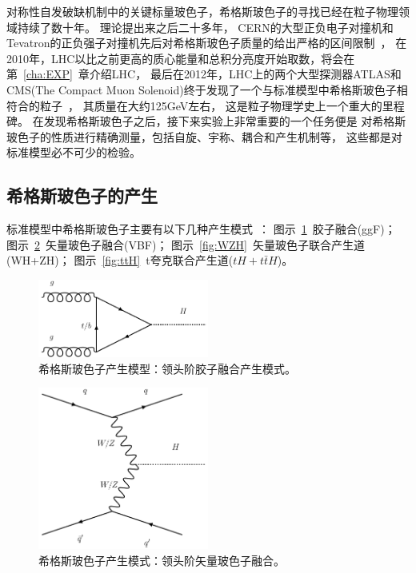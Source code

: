 对称性自发破缺机制中的关键标量玻色子，希格斯玻色子的寻找已经在粒子物理领域持续了数十年。
理论提出来之后二十多年，
CERN的大型正负电子对撞机和Tevatron的正负强子对撞机先后对希格斯玻色子质量的给出严格的区间限制~\cite{TEVN,LEP}，
在2010年，LHC以比之前更高的质心能量和总积分亮度开始取数，将会在第~\ref{cha:EXP}~章介绍LHC，
最后在2012年，LHC上的两个大型探测器ATLAS和CMS(The Compact Muon Solenoid)终于发现了一个与标准模型中希格斯玻色子相符合的粒子~\cite{ATLASHIGGS,CMSHIGGS}，
其质量在大约125GeV左右，
这是粒子物理学史上一个重大的里程碑。
在发现希格斯玻色子之后，接下来实验上非常重要的一个任务便是
对希格斯玻色子的性质进行精确测量，包括自旋、宇称、耦合和产生机制等，
这些都是对标准模型必不可少的检验。

\subsection{希格斯玻色子的产生}
\label{sec:HiggsPD}

标准模型中希格斯玻色子主要有以下几种产生模式~\cite{HANDHIGGS}：
图示~\ref{fig:ggF}~胶子融合(ggF)；
图示~\ref{fig:VBF}~矢量玻色子融合(VBF)；
图示~\ref{fig:WZH}~矢量玻色子联合产生道(WH+ZH)；
图示~\ref{fig:ttH}~t夸克联合产生道($tH+t\bar{t}H$)。

\begin{figure}
  \begin{center}
    \includegraphics[width=0.5\textwidth]{figuresTHE/ggF.pdf}
  \end{center}
  \caption{
希格斯玻色子产生模型：领头阶胶子融合产生模式。
}
    \label{fig:ggF}
\end{figure}

\begin{figure}
  \begin{center}
    \includegraphics[width=0.5\textwidth]{figuresTHE/VBF.pdf}
  \end{center}
  \caption{
希格斯玻色子产生模式：领头阶矢量玻色子融合。
}
    \label{fig:VBF}
\end{figure}


